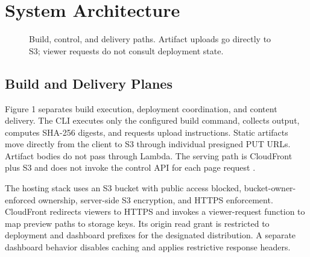 \documentclass[conference,letterpaper]{IEEEtran}
\begin{document}
\section{System Architecture}
\begin{figure}[t]\centering
{}
\caption{Build, control, and delivery paths. Artifact uploads go directly to S3; viewer requests do not consult deployment state.}\label{fig:architecture}
\end{figure}
\subsection{Build and Delivery Planes}
Figure 1 separates build execution, deployment coordination, and content delivery. The CLI executes only the configured build command, collects output, computes SHA-256 digests, and requests upload instructions. Static artifacts move directly from the client to S3 through individual presigned PUT URLs. Artifact bodies do not pass through Lambda. The serving path is CloudFront plus S3 and does not invoke the control API for each page request \cite{r1}.

The hosting stack uses an S3 bucket with public access blocked, bucket-owner-enforced ownership, server-side S3 encryption, and HTTPS enforcement. CloudFront redirects viewers to HTTPS and invokes a viewer-request function to map preview paths to storage keys. Its origin read grant is restricted to deployment and dashboard prefixes for the designated distribution. A separate dashboard behavior disables caching and applies restrictive response headers.
\end{document}
